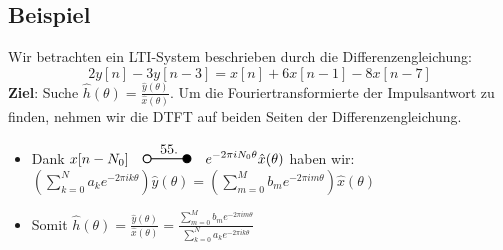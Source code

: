 \documentclass[11pt]{article}
\newcommand{\transform}[2]{%
    \begin{tikzpicture}
        \draw[thick] (0,0) circle (0.1);
        \draw[thick] (0.1,0) -- (#2,0) node[midway, above] {#1};
        \filldraw[thick] (#2,0) circle (0.1);
    \end{tikzpicture}%
}
\begin{document}
\subsection*{Beispiel}
\vspace*{-0.5cm}
Wir betrachten ein LTI-System beschrieben durch die Differenzengleichung:
$$2 y[n] - 3y[n-3] = x[n] + 6x[n-1] - 8x[n-7]$$
\textbf{Ziel}: Suche $\hat{h}(\theta) = \displaystyle\frac{\hat{y}(\theta)}{\hat{x}(\theta)}$. Um die Fouriertransformierte der Impulsantwort zu finden, nehmen wir die DTFT auf beiden Seiten der Differenzengleichung.
\vspace*{-0.5cm}
\begin{itemize}[leftmargin = 0pt]
    \item[] Dank $x[n-N_0] \hspace{10pt} \displaystyle\transform{55.}{1} \hspace{10pt}\displaystyle e^{-2 \pi i N_0 \theta} \hat{x}(\theta)$ haben wir: $\displaystyle\left( \displaystyle\sum_{k=0}^N a_k e^{-2\pi i k \theta}\right)\hat{y}(\theta) = \displaystyle\left( \displaystyle\sum_{m=0}^M b_m e^{-2 \pi i m \theta}\right)\hat{x}(\theta)$
    \item[] Somit $\hat{h}(\theta)= \displaystyle\frac{\hat{y}(\theta)}{\hat{x}(\theta)} = \displaystyle\frac{\displaystyle\sum_{m=0}^M b_m e^{-2 \pi i m \theta}}{ \displaystyle\sum_{k=0}^N a_k e^{-2\pi i k \theta}}
    $
\end{itemize}
\end{document}
